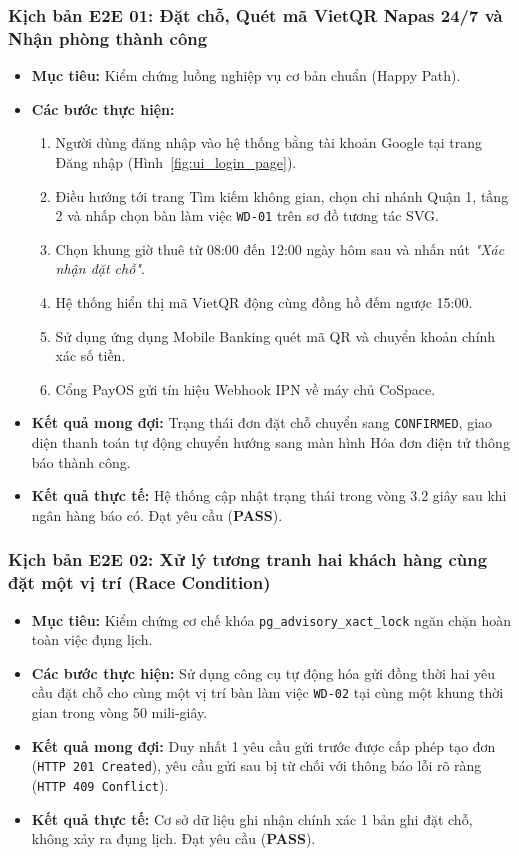 \subsubsection*{Kịch bản E2E 01: Đặt chỗ, Quét mã VietQR Napas 24/7 và Nhận phòng thành công}
\begin{itemize}
    \item \textbf{Mục tiêu:} Kiểm chứng luồng nghiệp vụ cơ bản chuẩn (Happy Path).
    \item \textbf{Các bước thực hiện:}
    \begin{enumerate}
        \item Người dùng đăng nhập vào hệ thống bằng tài khoản Google tại trang Đăng nhập (Hình~\ref{fig:ui_login_page}).
        \item Điều hướng tới trang Tìm kiếm không gian, chọn chi nhánh Quận 1, tầng 2 và nhấp chọn bàn làm việc \texttt{WD-01} trên sơ đồ tương tác SVG.
        \item Chọn khung giờ thuê từ 08:00 đến 12:00 ngày hôm sau và nhấn nút \textit{"Xác nhận đặt chỗ"}.
        \item Hệ thống hiển thị mã VietQR động cùng đồng hồ đếm ngược 15:00.
        \item Sử dụng ứng dụng Mobile Banking quét mã QR và chuyển khoản chính xác số tiền.
        \item Cổng PayOS gửi tín hiệu Webhook IPN về máy chủ CoSpace.
    \end{enumerate}
    \item \textbf{Kết quả mong đợi:} Trạng thái đơn đặt chỗ chuyển sang \texttt{CONFIRMED}, giao diện thanh toán tự động chuyển hướng sang màn hình Hóa đơn điện tử thông báo thành công.
    \item \textbf{Kết quả thực tế:} Hệ thống cập nhật trạng thái trong vòng 3.2 giây sau khi ngân hàng báo có. Đạt yêu cầu (\textbf{PASS}).
\end{itemize}

\subsubsection*{Kịch bản E2E 02: Xử lý tương tranh hai khách hàng cùng đặt một vị trí (Race Condition)}
\begin{itemize}
    \item \textbf{Mục tiêu:} Kiểm chứng cơ chế khóa \texttt{pg\_advisory\_xact\_lock} ngăn chặn hoàn toàn việc đụng lịch.
    \item \textbf{Các bước thực hiện:} Sử dụng công cụ tự động hóa gửi đồng thời hai yêu cầu đặt chỗ cho cùng một vị trí bàn làm việc \texttt{WD-02} tại cùng một khung thời gian trong vòng 50 mili-giây.
    \item \textbf{Kết quả mong đợi:} Duy nhất 1 yêu cầu gửi trước được cấp phép tạo đơn (\texttt{HTTP 201 Created}), yêu cầu gửi sau bị từ chối với thông báo lỗi rõ ràng (\texttt{HTTP 409 Conflict}).
    \item \textbf{Kết quả thực tế:} Cơ sở dữ liệu ghi nhận chính xác 1 bản ghi đặt chỗ, không xảy ra đụng lịch. Đạt yêu cầu (\textbf{PASS}).
\end{itemize}

